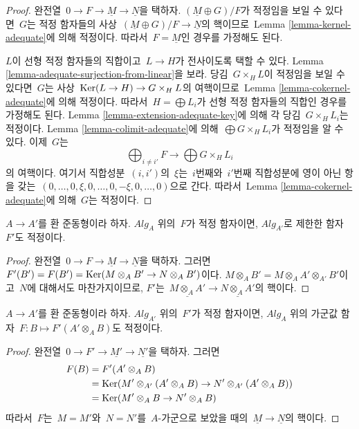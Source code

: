\begin{proof}
완전열\  $0 \to F \to \underline{M} \to \underline{N}$을 택하자.
$(\underline{M} \oplus G)/F$가 적정임을 보일 수 있다면\  $G$는 적정
함자들의 사상\  $(\underline{M} \oplus G)/F \to \underline{N}$의
핵이므로\  Lemma \ref{lemma-kernel-adequate}에 의해 적정이다. 따라서\ 
$F = \underline{M}$인 경우를 가정해도 된다.

\medskip\noindent
$L$이 선형 적정 함자들의 직합이고\  $L \to H$가 전사이도록 택할 수
있다. Lemma \ref{lemma-adequate-surjection-from-linear}을 보라.
당김\  $G \times_H L$이 적정임을 보일 수 있다면\  $G$는 사상\ 
$\mathop{\mathrm{Ker}}(L \to H) \to G \times_H L$의 여핵이므로\  Lemma
\ref{lemma-cokernel-adequate}에 의해 적정이다. 따라서\ 
$H = \bigoplus L_i$가 선형 적정 함자들의 직합인 경우를 가정해도
된다. Lemma \ref{lemma-extension-adequate-key}에 의해 각 당김\ 
$G \times_H L_i$는 적정이다. Lemma \ref{lemma-colimit-adequate}에
의해\  $\bigoplus G \times_H L_i$가 적정임을 알 수 있다. 이제\  $G$는
$$
\bigoplus\nolimits_{i \not = i'} F \longrightarrow
\bigoplus G \times_H L_i
$$
의 여핵이다. 여기서 직합성분\  $(i, i')$의\  $\xi$는\  $i$번째와\ 
$i'$번째 직합성분에 영이 아닌 항을 갖는\ 
$(0, \ldots, 0, \xi, 0, \ldots, 0, -\xi, 0, \ldots, 0)$으로 간다.
따라서\  Lemma \ref{lemma-cokernel-adequate}에 의해\  $G$는 적정이다.
\end{proof}

\begin{lemma}
\label{lemma-base-change-adequate}
$A \to A'$를 환 준동형이라 하자. $\textit{Alg}_A$ 위의\  $F$가
적정 함자이면, $\textit{Alg}_{A'}$로 제한한 함자\  $F'$도 적정이다.
\end{lemma}

\begin{proof}
완전열\  $0 \to F \to \underline{M} \to \underline{N}$을 택하자.
그러면\  $F'(B') = F(B') = \mathop{\mathrm{Ker}}(M \otimes_A B' \to N \otimes_A B')$이다.
$M \otimes_A B' = M \otimes_A A' \otimes_{A'} B'$이고\  $N$에 대해서도
마찬가지이므로, $F'$는\ 
$\underline{M \otimes_A A'} \to \underline{N \otimes_A A'}$의 핵이다.
\end{proof}

\begin{lemma}
\label{lemma-pushforward-adequate}
$A \to A'$를 환 준동형이라 하자. $\textit{Alg}_{A'}$ 위의\  $F'$가
적정 함자이면, $\textit{Alg}_A$ 위의 가군값 함자\ 
$F : B \mapsto F'(A' \otimes_A B)$도 적정이다.
\end{lemma}

\begin{proof}
완전열\  $0 \to F' \to \underline{M'} \to \underline{N'}$을 택하자.
그러면
\begin{align*}
F(B) & = F'(A' \otimes_A B) \\
& = \mathop{\mathrm{Ker}}(M' \otimes_{A'} (
A' \otimes_A B) \to N' \otimes_{A'} (A' \otimes_A B)) \\
& = \mathop{\mathrm{Ker}}(M' \otimes_A B \to N' \otimes_A B)
\end{align*}
따라서\  $F$는\  $M = M'$와\  $N = N'$를\  $A$-가군으로 보았을 때의\ 
$\underline{M} \to \underline{N}$의 핵이다.
\end{proof}

